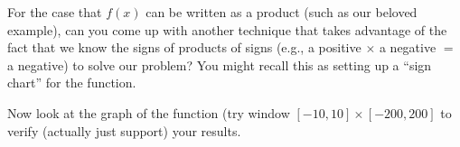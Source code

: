 \documentclass{ximera}
\begin{document}
For the case that $f(x)$ can be written as a product (such as our beloved example), can you come up with another technique that takes advantage of the fact that we know the signs of products of signs (e.g., a positive $\times$ a negative $=$ a negative) to solve our problem?  You might recall this as setting up a ``sign chart'' for the function.

Now look at the graph of the function (try window $[-10, 10]\times [-200, 200]$ to verify (actually just support) your results.
\end{document}
